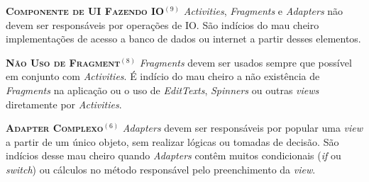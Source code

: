 

  \noindent
  \textsc{\textbf{{\small Componente de UI Fazendo IO}}}$^{(9)}$ 
      \textit{Activities}, \textit{Fragments} e \textit{Adapters} não devem ser responsáveis por operações de IO. São indícios do mau cheiro implementações de acesso a banco de dados ou internet a partir desses elementos.



  \noindent
  \textsc{\textbf{{\small Não Uso de Fragment}}}$^{(8)}$ \textit{Fragments} devem ser usados sempre que possível em conjunto com \textit{Activities}. É indício do mau cheiro a não existência de \textit{Fragments} na aplicação ou o uso de \textit{EditTexts}, \textit{Spinners} ou outras \textit{views} diretamente por \textit{Activities}.



  \noindent
  \textsc{\textbf{{\small Adapter Complexo}}}$^{(6)}$ \textit{Adapters} devem ser responsáveis por popular uma \textit{view} a partir de um único objeto, sem realizar lógicas ou tomadas de decisão. São indícios desse mau cheiro quando \textit{Adapters} contêm muitos condicionais (\textit{if} ou \textit{switch}) ou cálculos no método responsável pelo preenchimento da \textit{view}.




